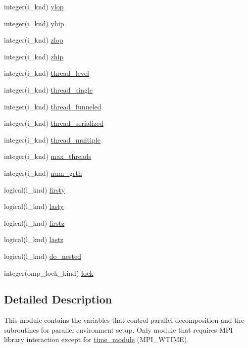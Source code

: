 \begin{DoxyCompactItemize}
$$integer(i\-\_\-knd) \hyperlink{classplib__module_a95589a7523a49a05f8af1b39f7e75df8}{ylop}
\item 
integer(i\-\_\-knd) \hyperlink{classplib__module_a5520d897cd8da06d1815c1ec27010cf3}{yhip}
\item 
integer(i\-\_\-knd) \hyperlink{classplib__module_a3a7c2d7b52bbd28281bd1affd1d50bf1}{zlop}
\item 
integer(i\-\_\-knd) \hyperlink{classplib__module_ac18f767501ee98501fbf13da3185aae7}{zhip}
\item 
integer(i\-\_\-knd) \hyperlink{classplib__module_a704c693732d15c474f76b340e3b1c54f}{thread\-\_\-level}
\item 
integer(i\-\_\-knd) \hyperlink{classplib__module_a976973aed6846d0da2cc7fc29e0f0097}{thread\-\_\-single}
\item 
integer(i\-\_\-knd) \hyperlink{classplib__module_aaf61faf216e801843c4b8121eab84956}{thread\-\_\-funneled}
\item 
integer(i\-\_\-knd) \hyperlink{classplib__module_a117ac57a3b41c9fae508f8674fe45f0f}{thread\-\_\-serialized}
\item 
integer(i\-\_\-knd) \hyperlink{classplib__module_af4045f02bfdd6ce98120023046d4c1ca}{thread\-\_\-multiple}
\item 
integer(i\-\_\-knd) \hyperlink{classplib__module_aac421ecf4251867c4bff7045095d596c}{max\-\_\-threads}
\item 
integer(i\-\_\-knd) \hyperlink{classplib__module_a8238cefc81a445bee3e137bb94f75e91}{num\-\_\-grth}
\item 
logical(l\-\_\-knd) \hyperlink{classplib__module_acacb5f9f63dcc742ef176b99534fe626}{firsty}
\item 
logical(l\-\_\-knd) \hyperlink{classplib__module_ac8204e5b33211c1fe40e991a11d63f95}{lasty}
\item 
logical(l\-\_\-knd) \hyperlink{classplib__module_a2d791ed6cdd38a29604dcb99a7a556fe}{firstz}
\item 
logical(l\-\_\-knd) \hyperlink{classplib__module_a5d6addca95cdb6299949d278355bed3b}{lastz}
\item 
logical(l\-\_\-knd) \hyperlink{classplib__module_a68a4ebbe262904bf323f37f2e97ee5f2}{do\-\_\-nested}
\item 
integer(omp\-\_\-lock\-\_\-kind) \hyperlink{classplib__module_a3f4964cd381feb76e21407e3b96915c9}{lock}
\end{DoxyCompactItemize}


\subsection{Detailed Description}
This module contains the variables that control parallel decomposition and the subroutines for parallel environment setup. Only module that requires M\-P\-I library interaction except for \hyperlink{classtime__module}{time\-\_\-module} (M\-P\-I\-\_\-\-W\-T\-I\-M\-E). 

